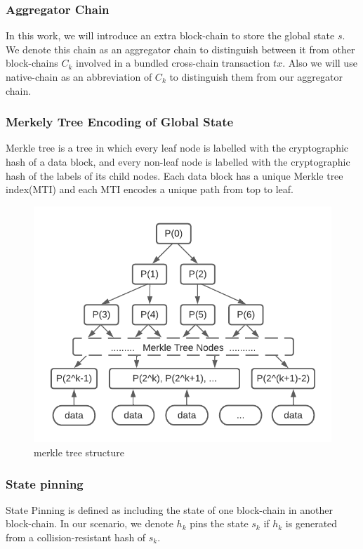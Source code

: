 \documentclass[pageno]{jpaper}
\begin{document}
\subsubsection{Aggregator Chain}
In this work, we will introduce an extra block-chain to store the global state $s$. We denote this chain as an aggregator chain to distinguish between it from other block-chains $C_{k}$ involved in a bundled cross-chain transaction $tx$. Also we will use native-chain as an abbreviation of $C_{k}$ to distinguish them from our aggregator chain.
\\
\subsubsection{Merkely Tree Encoding of Global State}
Merkle\cite{becker2008merkle} tree is a tree in which every leaf node is labelled with the cryptographic hash of a data block, and every non-leaf node is labelled with the cryptographic hash of the labels of its child nodes. Each data block has a unique Merkle tree index(MTI) and each MTI encodes a unique path from top to leaf.\\

\begin{figure}[!ht]
\caption{merkle tree structure}
\label{merkle-tree}
\includegraphics[scale=0.6]{merkle-tree}
\end{figure}

\subsubsection{State pinning}
State Pinning\cite{robinson2019anonymous} is defined as including the state of one block-chain in another block-chain. In our scenario, we denote $h_k$ pins the state $s_k$ if $h_k$ is generated from a collision-resistant hash of $s_k$.
\\
\end{document}

